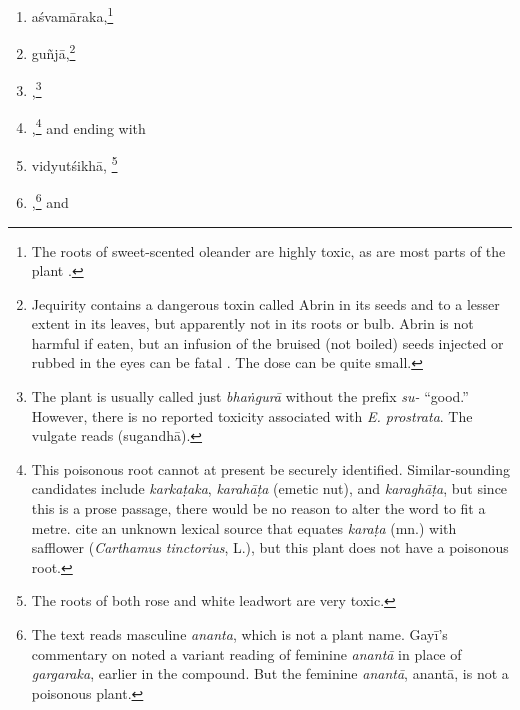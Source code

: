 \begin{translation}
\begin{itemize}
\begin{enumerate}
        \item \gls{aśvamāraka},\footnote{The roots of sweet-scented oleander 
        are highly toxic, as are most parts of the plant \citep{pill-2019}.}
    
        \item \gls{guñjā},\footnote{Jequirity contains a dangerous
        toxin called Abrin in its seeds and to a lesser extent in its leaves,
        but apparently not in its roots or bulb. Abrin is not harmful if eaten,
        but an infusion of the bruised (not boiled) seeds injected or rubbed in
        the eyes can be fatal \citep[\# 6]{NK}.  The dose can be quite small.}
        
        \item {},\footnote{The plant is
usually called just \emph{bhaṅgurā} without the prefix \emph{su-} “good.”  However, there 
is no reported toxicity associated with \emph{E. prostrata}.  The vulgate reads 
 (\gls{sugandhā}).}
        
       \item {},\footnote{This poisonous root cannot at present
be securely identified.  Similar-sounding candidates include \emph{karkaṭaka},
\emph{karahāṭa} (emetic nut), and \emph{karaghāṭa}, but since this is a
prose passage, there would be no reason to alter the word to fit a metre.
\citet[255]{moni-sans} cite an unknown lexical source that equates
\emph{karaṭa} (mn.) with safflower (\emph{Carthamus tinctorius}, L.), but
this plant does not have a poisonous root.} 
%
and ending with 
%
\item \gls{vidyutśikhā},%
\footnote{The roots of both rose and white leadwort are very toxic.} 

\item {},\footnote{The text reads masculine
    \emph{ananta}, which is not a plant name.  Gayī's commentary on
     noted a variant reading of feminine \emph{anantā} in
    place of \emph{gargaraka}, earlier in the compound. But the feminine
    \emph{anantā}, \gls{anantā}, is not a poisonous plant.} and


\end{enumerate}
\end{itemize}
\end{translation}
